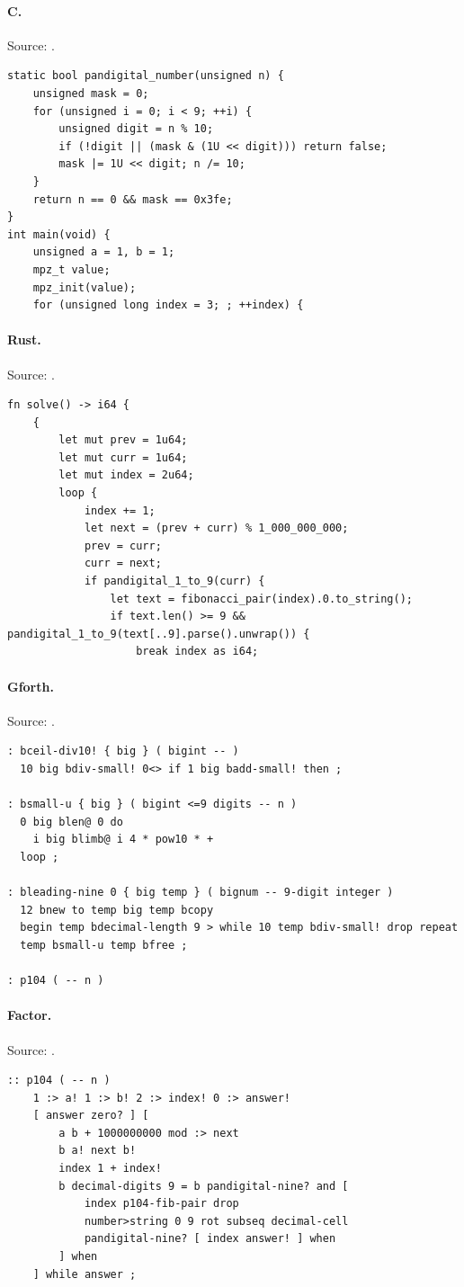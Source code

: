 \paragraph{C.} Source: .
\begin{lstlisting}
static bool pandigital_number(unsigned n) {
    unsigned mask = 0;
    for (unsigned i = 0; i < 9; ++i) {
        unsigned digit = n % 10;
        if (!digit || (mask & (1U << digit))) return false;
        mask |= 1U << digit; n /= 10;
    }
    return n == 0 && mask == 0x3fe;
}
int main(void) {
    unsigned a = 1, b = 1;
    mpz_t value;
    mpz_init(value);
    for (unsigned long index = 3; ; ++index) {
\end{lstlisting}

\paragraph{Rust.} Source: .
\begin{lstlisting}
fn solve() -> i64 {
    {
        let mut prev = 1u64;
        let mut curr = 1u64;
        let mut index = 2u64;
        loop {
            index += 1;
            let next = (prev + curr) % 1_000_000_000;
            prev = curr;
            curr = next;
            if pandigital_1_to_9(curr) {
                let text = fibonacci_pair(index).0.to_string();
                if text.len() >= 9 && pandigital_1_to_9(text[..9].parse().unwrap()) {
                    break index as i64;
\end{lstlisting}

\paragraph{Gforth.} Source: .
\begin{lstlisting}
: bceil-div10! { big } ( bigint -- )
  10 big bdiv-small! 0<> if 1 big badd-small! then ;

: bsmall-u { big } ( bigint <=9 digits -- n )
  0 big blen@ 0 do
    i big blimb@ i 4 * pow10 * +
  loop ;

: bleading-nine 0 { big temp } ( bignum -- 9-digit integer )
  12 bnew to temp big temp bcopy
  begin temp bdecimal-length 9 > while 10 temp bdiv-small! drop repeat
  temp bsmall-u temp bfree ;

: p104 ( -- n )
\end{lstlisting}

\paragraph{Factor.} Source: .
\begin{lstlisting}
:: p104 ( -- n )
    1 :> a! 1 :> b! 2 :> index! 0 :> answer!
    [ answer zero? ] [
        a b + 1000000000 mod :> next
        b a! next b!
        index 1 + index!
        b decimal-digits 9 = b pandigital-nine? and [
            index p104-fib-pair drop
            number>string 0 9 rot subseq decimal-cell
            pandigital-nine? [ index answer! ] when
        ] when
    ] while answer ;
\end{lstlisting}

